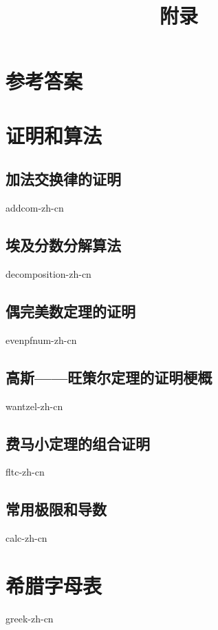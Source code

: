 \documentclass[b5paper]{ctexart}
\begin{document}
\title{附录}

\maketitle
\fi

\chapter{参考答案}
\label{ch:answers}
\shipoutAnswer

\chapter{证明和算法}

\section{加法交换律的证明}
{addcom-zh-cn}

\section{埃及分数分解算法}
{decomposition-zh-cn}

\section{偶完美数定理的证明}
{evenpfnum-zh-cn}

\section{高斯——旺策尔定理的证明梗概}
{wantzel-zh-cn}

\section{费马小定理的组合证明}
{fltc-zh-cn}

\section{常用极限和导数}
{calc-zh-cn}

\chapter{希腊字母表} \label{ch:greek-letters}
{greek-zh-cn}
\end{document}
